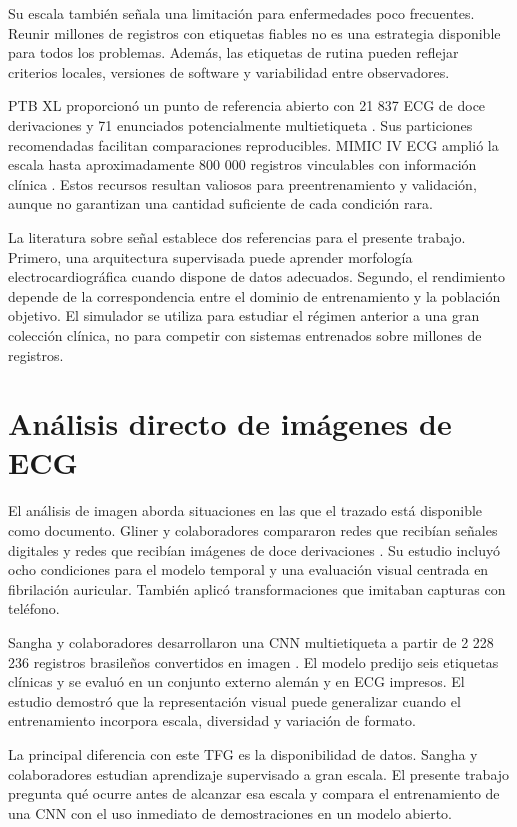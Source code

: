 Su escala también señala una limitación para enfermedades poco frecuentes. Reunir millones de registros con etiquetas fiables no es una estrategia disponible para todos los problemas. Además, las etiquetas de rutina pueden reflejar criterios locales, versiones de software y variabilidad entre observadores.

PTB XL proporcionó un punto de referencia abierto con 21 837 ECG de doce derivaciones y 71 enunciados potencialmente multietiqueta \cite{wagner2020}. Sus particiones recomendadas facilitan comparaciones reproducibles. MIMIC IV ECG amplió la escala hasta aproximadamente 800 000 registros vinculables con información clínica \cite{gow2023}. Estos recursos resultan valiosos para preentrenamiento y validación, aunque no garantizan una cantidad suficiente de cada condición rara.

La literatura sobre señal establece dos referencias para el presente trabajo. Primero, una arquitectura supervisada puede aprender morfología electrocardiográfica cuando dispone de datos adecuados. Segundo, el rendimiento depende de la correspondencia entre el dominio de entrenamiento y la población objetivo. El simulador se utiliza para estudiar el régimen anterior a una gran colección clínica, no para competir con sistemas entrenados sobre millones de registros.

\section{Análisis directo de imágenes de ECG}

El análisis de imagen aborda situaciones en las que el trazado está disponible como documento. Gliner y colaboradores compararon redes que recibían señales digitales y redes que recibían imágenes de doce derivaciones \cite{gliner2020}. Su estudio incluyó ocho condiciones para el modelo temporal y una evaluación visual centrada en fibrilación auricular. También aplicó transformaciones que imitaban capturas con teléfono.

Sangha y colaboradores desarrollaron una CNN multietiqueta a partir de 2 228 236 registros brasileños convertidos en imagen \cite{sangha2022}. El modelo predijo seis etiquetas clínicas y se evaluó en un conjunto externo alemán y en ECG impresos. El estudio demostró que la representación visual puede generalizar cuando el entrenamiento incorpora escala, diversidad y variación de formato.

La principal diferencia con este TFG es la disponibilidad de datos. Sangha y colaboradores estudian aprendizaje supervisado a gran escala. El presente trabajo pregunta qué ocurre antes de alcanzar esa escala y compara el entrenamiento de una CNN con el uso inmediato de demostraciones en un modelo abierto.

